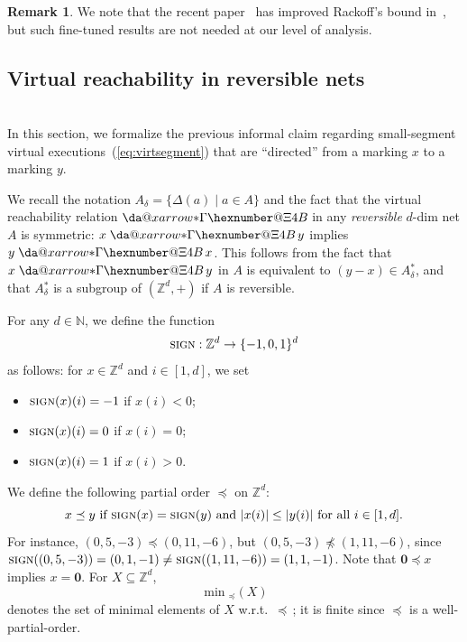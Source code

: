 \documentclass[11pt,a4paper]{amsart}
\makeatletter
\newcommand{\virtual}[1]{\mathrel{\xdashrightarrow{#1}}\hspace{-0.3em}}
\newcommand{\vreach}{\virtual{*}}
\newcommand{\sleq}{\preceq}
\newcommand{\minsleq}[1]{\min{}_\sleq(#1)}
\newcommand{\sign}{\textsc{sign}}
\newcommand{\D}{{}_{\delta}}
\newcommand{\Nat}{\mathbb{N}}
\newcommand{\Zset}{\mathbb{Z}}
\newcommand{\setZ}{\Zset}
\newcommand*{\da@rightarrow}{\mathchar"0\hexnumber@\symAMSa 4B }
\newcommand*{\xdashrightarrow}[2][]{%
  \mathrel{%
    \mathpalette{\da@xarrow{#1}{#2}{}\da@rightarrow{\,}{}}{}%
  }%
}
\newcommand*{\da@xarrow}[7]{%
  \sbox0{$\ifx#7\scriptstyle\scriptscriptstyle\else\scriptstyle\fi#5#1#6\m@th$}%
  \sbox2{$\ifx#7\scriptstyle\scriptscriptstyle\else\scriptstyle\fi#5#2#6\m@th$}%
  \sbox4{$#7\dabar@\m@th$}%
  \dimen@=\wd0 %
  \ifdim\wd2 >\dimen@
    \dimen@=\wd2 %
  \fi
  \count@=2 %
  \def\da@bars{\dabar@\dabar@}%
  \@whiledim\count@\wd4<\dimen@\do{%
    \advance\count@\@ne
    \expandafter\def\expandafter\da@bars\expandafter{%
      \da@bars
      \dabar@ 
    }%
  }%
  \mathrel{#3}%
  \mathrel{%
    \mathop{\da@bars}\limits
    \ifx\\#1\\%
    \else
      _{\copy0}%
    \fi
    \ifx\\#2\\%
    \else
      ^{\copy2}%
    \fi
  }%
  \mathrel{#4}%
}
\let\origtextsc\textsc
\renewcommand{\textsc}[1]{\textnormal{\origtextsc{#1}}}
\theoremstyle{plain}
\theoremstyle{definition}
\newtheorem{rem}[thm]{Remark}
\theoremstyle{defC}
\theoremstyle{thmC}
\makeatother
\begin{document}
\begin{rem}
We note that the recent
paper~\cite{kunnemann_et_al:LIPIcs.ICALP.2023.131} has improved Rackoff's
bound in~\cite{DBLP:journals/tcs/Rackoff78}, but such fine-tuned
results are not needed at our level of analysis.
\end{rem}


\subsection{Virtual reachability in reversible 
nets}\label{subsec:virtrevers}
\hfill\\

In this section, we formalize the previous informal claim regarding small-segment
virtual executions~(\ref{eq:virtsegment})
that are ``directed'' from a marking $x$ to a marking $y$.


We recall the notation $A\D=\{\Delta(a)\mid a\in
A\}$ and the fact that
the virtual reachability relation $\vreach$ in any
\emph{reversible} $d$-dim net $A$ is
symmetric: $x\virtual{*}y$ implies $y\virtual{*}x$.
This follows from the fact that $x\virtual{*}y$ in $A$ is equivalent to
$(y-x)\in A\D^*$, and that 
$A\D^*$  is a subgroup of
$(\setZ^d,+)$ if $A$ is reversible.


For any $d\in\Nat$, we define the function 
\begin{equation*}
\sign:\setZ^d\to\{-1,0,1\}^d
\end{equation*}
as follows:
 for $x\in\setZ^d$ and $i\in[1,d]$, we set
\begin{itemize}
	\item		
 $\sign(x)(i)=-1$ if $x(i)<0$;
\item
$\sign(x)(i)=0$ if $x(i)=0$;
\item
		$\sign(x)(i)=1$ if $x(i)>0$.
\end{itemize}
		We define the following partial order $\sleq$ on $\setZ^d$:
\begin{equation*}
	\textnormal{$x\sleq y$\ if $\sign(x)=\sign(y)$ and $|x(i)|\leq
	|y(i)|$ for all $i\in [1,d]$.} 
\end{equation*}
For instance, $(0,5,-3)\sleq (0,11,-6)$, but 
 $(0,5,-3)\not\sleq (1,11,-6)$, since
 $\sign((0,5,-3))=(0,1,-1)\neq\sign((1,11,-6))=(1,1,-1)$.
Note that $\mathbf{0}\sleq x$ implies $x=\mathbf{0}$.
For $X\subseteq \setZ^d$, 
\[\minsleq{X}\]
denotes the set of 
minimal elements of $X$ w.r.t.\ $\sleq$\,; it is finite
since
$\sleq$ is a well-partial-order.
\end{document}

